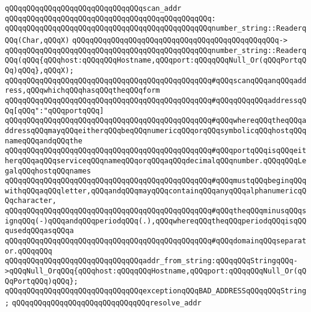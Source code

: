 \newline
\verb|qQQqqQQqqQQqqQQqqQQqqQQqqQQqqQQqscan_addr|\newline
\verb|qQQqqQQqqQQqqQQqqQQqqQQqqQQqqQQqqQQqqQQqqQQqqQQq:|\newline
\verb|qQQqqQQqqQQqqQQqqQQqqQQqqQQqqQQqqQQqqQQqqQQqqQQqnumber_string::ReaderqQQq(Char,qQQqX)|\newline
\verb|qQQqqQQqqQQqqQQqqQQqqQQqqQQqqQQqqQQqqQQqqQQqqQQq->|\newline
\verb|qQQqqQQqqQQqqQQqqQQqqQQqqQQqqQQqqQQqqQQqqQQqqQQqnumber_string::ReaderqQQq(qQQq{qQQqhost:qQQqqQQqHostname,qQQqport:qQQqqQQqNull_Or(qQQqPortqQQq)qQQq},qQQqX);|\newline
\newline
\verb|qQQqqQQqqQQqqQQqqQQqqQQqqQQqqQQqqQQqqQQqqQQqqQQq#qQQqscanqQQqanqQQqaddress,qQQqwhichqQQqhasqQQqtheqQQqform|\newline
\verb|qQQqqQQqqQQqqQQqqQQqqQQqqQQqqQQqqQQqqQQqqQQqqQQq#qQQqqQQqqQQqaddressqQQq[qQQq":"qQQqportqQQq]|\newline
\verb|qQQqqQQqqQQqqQQqqQQqqQQqqQQqqQQqqQQqqQQqqQQqqQQq#qQQqwhereqQQqtheqQQqaddressqQQqmayqQQqeitherqQQqbeqQQqnumericqQQqorqQQqsymbolicqQQqhostqQQqnameqQQqandqQQqthe|\newline
\verb|qQQqqQQqqQQqqQQqqQQqqQQqqQQqqQQqqQQqqQQqqQQqqQQq#qQQqportqQQqisqQQqeitherqQQqaqQQqserviceqQQqnameqQQqorqQQqaqQQqdecimalqQQqnumber.qQQqqQQqLegalqQQqhostqQQqnames|\newline
\verb|qQQqqQQqqQQqqQQqqQQqqQQqqQQqqQQqqQQqqQQqqQQqqQQq#qQQqmustqQQqbeginqQQqwithqQQqaqQQqletter,qQQqandqQQqmayqQQqcontainqQQqanyqQQqalphanumericqQQqcharacter,|\newline
\verb|qQQqqQQqqQQqqQQqqQQqqQQqqQQqqQQqqQQqqQQqqQQqqQQq#qQQqtheqQQqminusqQQqsignqQQq(-)qQQqandqQQqperiodqQQq(.),qQQqwhereqQQqtheqQQqperiodqQQqisqQQqusedqQQqasqQQqa|\newline
\verb|qQQqqQQqqQQqqQQqqQQqqQQqqQQqqQQqqQQqqQQqqQQqqQQq#qQQqdomainqQQqseparator.qQQqqQQq|\newline
\newline
\verb|qQQqqQQqqQQqqQQqqQQqqQQqqQQqqQQqaddr_from_string:qQQqqQQqStringqQQq->qQQqNull_OrqQQq{qQQqhost:qQQqqQQqHostname,qQQqport:qQQqqQQqNull_Or(qQQqPortqQQq)qQQq};|\newline
\newline
\verb|qQQqqQQqqQQqqQQqqQQqqQQqqQQqqQQqexceptionqQQqBAD_ADDRESSqQQqqQQqString;|\newline
\newline
\verb|qQQqqQQqqQQqqQQqqQQqqQQqqQQqqQQqresolve_addr|\newline
